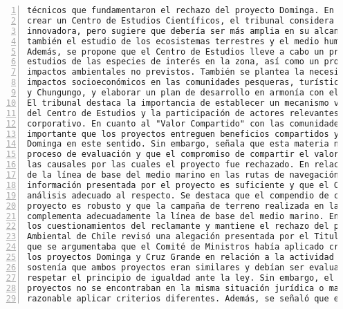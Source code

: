 \begin{Verbatim}[frame=lines, label=Elavoración propia -  Ejemplo de Contexto enviado por el Chatbot a OpenAI
				, fontsize=\footnotesize, numbers=left
				, baselinestretch=0.4
				, formatcom=\color{gray}]
técnicos que fundamentaron el rechazo del proyecto Dominga. En cuanto a la medida propuesta de
crear un Centro de Estudios Científicos, el tribunal considera que es interesante e
innovadora, pero sugiere que debería ser más amplia en su alcance y concepción, abarcando
también el estudio de los ecosistemas terrestres y el medio humano en la comuna de La Higuera.
Además, se propone que el Centro de Estudios lleve a cabo un programa de investigación y
estudios de las especies de interés en la zona, así como un protocolo de acción frente a
impactos ambientales no previstos. También se plantea la necesidad de medir los posibles
impactos socioeconómicos en las comunidades pesqueras, turísticas y productivas de Los Choros
y Chungungo, y elaborar un plan de desarrollo en armonía con el plan de desarrollo regional.
El tribunal destaca la importancia de establecer un mecanismo vinculante para las decisiones
del Centro de Estudios y la participación de actores relevantes en su diseño y gobierno
corporativo. En cuanto al "Valor Compartido" con las comunidades, el tribunal considera que es
importante que los proyectos entreguen beneficios compartidos y reconoce la propuesta de
Dominga en este sentido. Sin embargo, señala que esta materia no se encuentra discutida en el
proceso de evaluación y que el compromiso de compartir el valor del negocio no puede sobreseer
las causales por las cuales el proyecto fue rechazado. En relación a la supuesta insuficiencia
de la línea de base del medio marino en las rutas de navegación, el tribunal considera que la
información presentada por el proyecto es suficiente y que el Comité de Ministros no hizo un
análisis adecuado al respecto. Se destaca que el compendio de conocimiento entregado por el
proyecto es robusto y que la campaña de terreno realizada en las rutas de navegación
complementa adecuadamente la línea de base del medio marino. En conclusión, el tribunal acoge
los cuestionamientos del reclamante y mantiene el rechazo del proyecto Dominga.\nEl Tribunal
Ambiental de Chile revisó una alegación presentada por el Titular del proyecto Dominga, en la
que se argumentaba que el Comité de Ministros había aplicado criterios diferentes al evaluar
los proyectos Dominga y Cruz Grande en relación a la actividad de navegación. El Titular
sostenía que ambos proyectos eran similares y debían ser evaluados de manera análoga para
respetar el principio de igualdad ante la ley. Sin embargo, el Tribunal determinó que los
proyectos no se encontraban en la misma situación jurídica o material, por lo que era
razonable aplicar criterios diferentes. Además, se señaló que el proyecto Dominga no había

\end{Verbatim}
